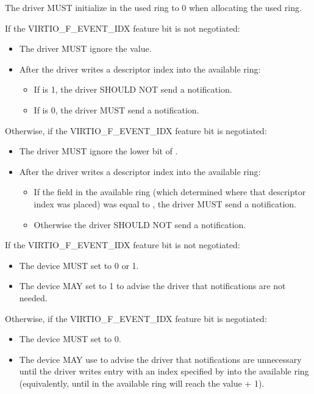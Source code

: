 The driver MUST initialize  in the used ring to 0 when
allocating the used ring.

If the VIRTIO_F_EVENT_IDX feature bit is not negotiated:
\begin{itemize}
\item The driver MUST ignore the  value.
\item After the driver writes a descriptor index into the available ring:
  \begin{itemize}
        \item If  is 1, the driver SHOULD NOT send a notification.
        \item If  is 0, the driver MUST send a notification.
  \end{itemize}
\end{itemize}

Otherwise, if the VIRTIO_F_EVENT_IDX feature bit is negotiated:
\begin{itemize}
\item The driver MUST ignore the lower bit of .
\item After the driver writes a descriptor index into the available ring:
  \begin{itemize}
        \item If the  field in the available ring (which determined
          where that descriptor index was placed) was equal to
          , the driver MUST send a notification.
        \item Otherwise the driver SHOULD NOT send a notification.
  \end{itemize}
\end{itemize}

If the VIRTIO_F_EVENT_IDX feature bit is not negotiated:
\begin{itemize}
\item The device MUST set  to 0 or 1.
\item The device MAY set  to 1 to advise
the driver that notifications are not needed.
\end{itemize}

Otherwise, if the VIRTIO_F_EVENT_IDX feature bit is negotiated:
\begin{itemize}
\item The device MUST set  to 0.
\item The device MAY use  to advise the driver that notifications are unnecessary until the driver writes entry with an index specified by  into the available ring (equivalently, until  in the
available ring will reach the value  + 1).
\end{itemize}

